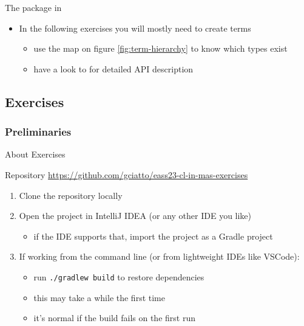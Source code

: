 \documentclass[presentation]{beamer}\mode<presentation>{\usetheme{AMSBolognaFC}}
\begin{document}
\begin{frame}[allowframebreaks]{The  package in }
\begin{itemize}
        \bigskip

        \item In the following exercises you will mostly need to create terms
        \begin{itemize}
            \item use the map on figure \ref{fig:term-hierarchy} to know \alert{which} types exist
            \item have a look to \cite{Ciatto20212pktPresentation} for detailed API description
        \end{itemize}
    \end{itemize}
\end{frame}

\subsection{Exercises}

\subsubsection{Preliminaries}

\begin{frame}{About Exercises}

    \begin{block}{Repository}
        \centering
        \url{https://github.com/gciatto/eass23-cl-in-mas-exercises}
    \end{block}
    \begin{enumerate}
        \item Clone the repository locally
        \item Open the project in IntelliJ IDEA (or any other IDE you like)
        \begin{itemize}
            \item if the IDE supports that, import the project as a Gradle project
        \end{itemize}
        \item If working from the command line (or from lightweight IDEs like VSCode):
        \begin{itemize}
            \item run \alert{\texttt{./gradlew build}} to restore dependencies
            \item this may take a while the first time
            \item it's normal if the build fails on the first run
        \end{itemize}
    \end{enumerate}
    
\end{frame}
\end{document}
